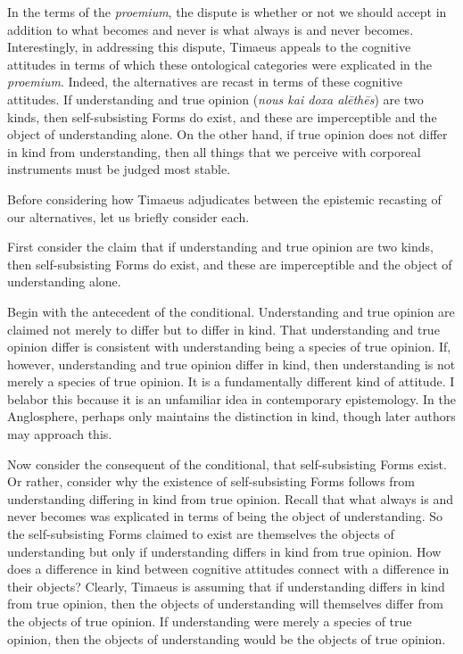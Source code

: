 In the terms of the \emph{proemium}, the dispute is whether or not we should accept in addition to what becomes and never is what always is and never becomes. Interestingly, in addressing this dispute, Timaeus appeals to the cognitive attitudes in terms of which these ontological categories were explicated in the \emph{proemium}. Indeed, the alternatives are recast in terms of these cognitive attitudes. If understanding and true opinion (\emph{nous kai doxa alēthēs}) are two kinds, then self-subsisting Forms do exist, and these are imperceptible and the object of understanding alone. On the other hand, if true opinion does not differ in kind from understanding, then all things that we perceive with corporeal instruments must be judged most stable.

Before considering how Timaeus adjudicates between the epistemic recasting of our alternatives, let us briefly consider each.

First consider the claim that if understanding and true opinion are two kinds, then self-subsisting Forms do exist, and these are imperceptible and the object of understanding alone. 

Begin with the antecedent of the conditional. Understanding and true opinion are claimed not merely to differ but to differ in kind. That understanding and true opinion differ is consistent with understanding being a species of true opinion. If, however, understanding and true opinion differ in kind, then understanding is not merely a species of true opinion. It is a fundamentally different kind of attitude. I belabor this because it is an unfamiliar idea in contemporary epistemology. In the Anglosphere, perhaps only \citet{Cook-Wilson:1926sf} maintains the distinction in kind, though later authors may approach this.

Now consider the consequent of the conditional, that self-subsisting Forms exist. Or rather, consider why the existence of self-subsisting Forms follows from understanding differing in kind from true opinion. Recall that what always is and never becomes was explicated in terms of being the object of understanding. So the self-subsisting Forms claimed to exist are themselves the objects of understanding but only if understanding differs in kind from true opinion. How does a difference in kind between cognitive attitudes connect with a difference in their objects? Clearly, Timaeus is assuming that if understanding differs in kind from true opinion, then the objects of understanding will themselves differ from the objects of true opinion. If understanding were merely a species of true opinion, then the objects of understanding would be the objects of true opinion. 

